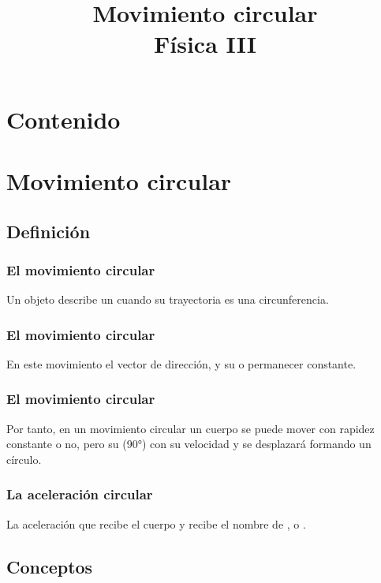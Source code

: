 \documentclass[14pt]{beamer}
\title{\Large{Movimiento circular} \\ \normalsize{Física III}}
\date{}
\begin{document}
\maketitle

\section*{Contenido}

\section{Movimiento circular}
\subsection{Definición}

\begin{frame}
\frametitle{El movimiento circular}
Un objeto describe un  cuando su trayectoria es una circunferencia.
\end{frame}
\begin{frame}
\frametitle{El movimiento circular}
En este movimiento el vector  de dirección, \pause y su  o permanecer constante.
\end{frame}
\begin{frame}
\frametitle{El movimiento circular}
Por tanto, en un movimiento circular un cuerpo se puede mover con rapidez constante o no, \pause pero su  (\ang{90}) con su velocidad \pause y se desplazará formando un círculo.
\end{frame}
\begin{frame}
\frametitle{La aceleración circular}
La aceleración que recibe el cuerpo  y recibe el nombre de , \pause {} \pause o .
\end{frame}

\subsection{Conceptos}
\end{document}
